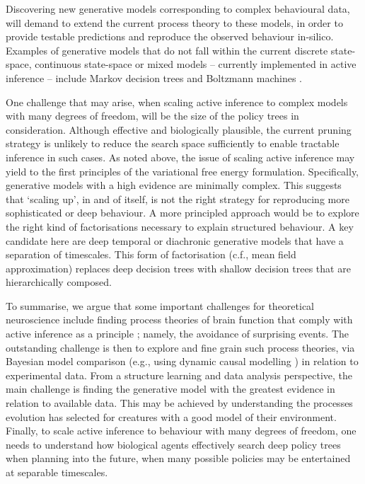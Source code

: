 \documentclass[review,12pt,authoryear]{elsarticle}
\begin{document}
Discovering new generative models corresponding to complex behavioural data, will demand to extend the current process theory to these models, in order to provide testable predictions and reproduce the observed behaviour in-silico. Examples of generative models that do not fall within the current discrete state-space, continuous state-space \citep{buckleyFreeEnergyPrinciple2017,fristonActiveInferenceAgency2012,adamsComputationalAnatomyPsychosis2013,brownActiveInferenceSensory2013,adamsPredictionsNotCommands2013,fristonPerceptionsHypothesesSaccades2012,brownFreeEnergyIllusionsCornsweet2012} or mixed \citep{fristonGraphicalBrainBelief2017,parrDiscreteContinuousBrain2018,parrComputationalPharmacologyOculomotion2019} models – currently implemented in active inference – include Markov decision trees \citep{jordanIntroductionVariationalMethods1998,jordanHiddenMarkovDecision1997} and Boltzmann machines \citep{stoneArtificialIntelligenceEngines2019,ackleyLearningAlgorithmBoltzmann1985,salakhutdinovEfficientLearningProcedure2012}.

One challenge that may arise, when scaling active inference to complex models with many degrees of freedom, will be the size of the policy trees in consideration. Although effective and biologically plausible, the current pruning strategy is unlikely to reduce the search space sufficiently to enable tractable inference in such cases. As noted above, the issue of scaling active inference may yield to the first principles of the variational free energy formulation. Specifically, generative models with a high evidence are minimally complex. This suggests that ‘scaling up’, in and of itself, is not the right strategy for reproducing more sophisticated or deep behaviour. A more principled approach would be to explore the right kind of factorisations necessary to explain structured behaviour. A key candidate here are deep temporal or diachronic generative models that have a separation of timescales. This form of factorisation (c.f., mean field approximation) replaces deep decision trees with shallow decision trees that are hierarchically composed.

To summarise, we argue that some important challenges for theoretical neuroscience include finding process theories of brain function that comply with active inference as a principle \citep{parrMarkovBlanketsInformation2019,fristonFreeEnergyPrinciple2019}; namely, the avoidance of surprising events. The outstanding challenge is then to explore and fine grain such process theories, via Bayesian model comparison (e.g., using dynamic causal modelling \citep{fristonDynamicCausalModelling2003,fristonHistoryFutureBayesian2012}) in relation to experimental data. From a structure learning and data analysis perspective, the main challenge is finding the generative model with the greatest evidence in relation to available data. This may be achieved by understanding the processes evolution has selected for creatures with a good model of their environment. Finally, to scale active inference to behaviour with many degrees of freedom, one needs to understand how biological agents effectively search deep policy trees when planning into the future, when many possible policies may be entertained at separable timescales.
\end{document}
